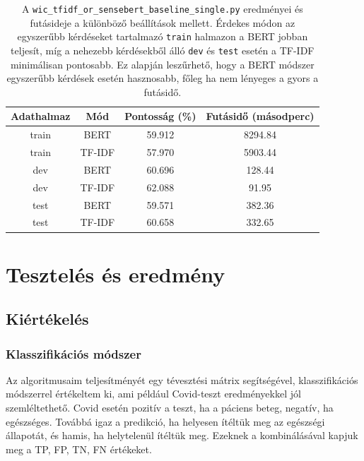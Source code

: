 \documentclass[12pt]{report}
\theoremstyle{definition}
\begin{document}
\begin{table}[h]
    \centering
    \begin{tabular}{c|c|c|c}
    \hline
    Adathalmaz & Mód & Pontosság (\%) & Futásidő (másodperc) \\ \hline
        train & BERT & 59.912 & 8294.84 \\ \hline
        train & TF-IDF & 57.970 & 5903.44 \\ \hline
        dev & BERT & 60.696 & 128.44 \\ \hline
        dev & TF-IDF & 62.088 & 91.95 \\ \hline
        test & BERT & 59.571 & 382.36 \\ \hline
        test & TF-IDF & 60.658 & 332.65 \\ \hline
    \end{tabular}
    \caption{A \texttt{wic\_tfidf\_or\_sensebert\_baseline\_single.py} eredményei és futásideje a különböző beállítások mellett. Érdekes módon az egyszerűbb kérdéseket tartalmazó \texttt{train} halmazon a BERT jobban teljesít, míg a nehezebb kérdésekből álló \texttt{dev} és \texttt{test} esetén a TF-IDF minimálisan pontosabb. Ez alapján leszűrhető, hogy a BERT módszer egyszerűbb kérdések esetén hasznosabb, főleg ha nem lényeges a gyors a futásidő.}
    \label{tab:my_label}
\end{table}

\section{Tesztelés és eredmény}

\subsection{Kiértékelés}

\subsubsection{Klasszifikációs módszer}
Az algoritmusaim teljesítményét egy tévesztési mátrix segítségével, klasszifikációs módszerrel értékeltem ki, ami például Covid-teszt eredményekkel jól szemléltethető. Covid esetén pozitív a teszt, ha a páciens beteg, negatív, ha egészséges. Továbbá igaz a predikció, ha helyesen ítéltük meg az egészségi állapotát, és hamis, ha helytelenül ítéltük meg. Ezeknek a kombinálásával kapjuk meg a TP, FP, TN, FN értékeket.
\end{document}
